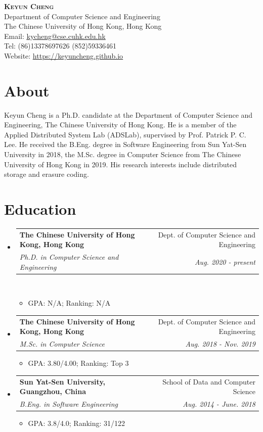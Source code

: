 \documentclass[letterpaper,11pt]{article}
\makeatletter
\newcommand{\resumeItem}[1]{
  \item\small{
    {#1 \vspace{-2pt}}
  }
}
\newcommand{\resumeSubheading}[4]{
  \vspace{-2pt}\item
    \begin{tabular*}{0.97\textwidth}[t]{l@{\extracolsep{\fill}}r}
      \textbf{#1} & #2 \\
      \textit{\small#3} & \textit{\small #4} \\
    \end{tabular*}\vspace{-4pt}
}
\newcommand{\resumeSubHeadingListStart}{\begin{itemize}[leftmargin=0.15in, label={}]}
\newcommand{\resumeSubHeadingListEnd}{\end{itemize}}
\newcommand{\resumeItemListStart}{\begin{itemize}}
\newcommand{\resumeItemListEnd}{\end{itemize}\vspace{-4pt}}
\makeatother
\begin{document}

\begin{center}
    \textbf{\huge \scshape Keyun Cheng} \\ \vspace{5pt}
    Department of Computer Science and Engineering \\
    The Chinese University of Hong Kong, Hong Kong \\
    Email: \href{mailto:kycheng@cse.cuhk.edu.hk}{\underline{kycheng@cse.cuhk.edu.hk}} \\
    Tel: (86)13378697626 (852)59336461 \\
    Website: \href{https://keyuncheng.github.io}{\underline{https://keyuncheng.github.io}}
\end{center}

\section{About}
Keyun Cheng is a Ph.D. candidate at the Department of Computer Science and
Engineering, The Chinese University of Hong Kong. He is a member of the
Applied Distributed System Lab (ADSLab), supervised by Prof. Patrick P. C.
Lee. He received the B.Eng. degree in Software Engineering from Sun Yat-Sen
University in 2018, the M.Sc. degree in Computer Science from The Chinese
University of Hong Kong in 2019. His research interests include distributed
storage and erasure coding.

\section{Education}
  \resumeSubHeadingListStart
    \resumeSubheading
      {The Chinese University of Hong Kong, Hong Kong}{Dept. of Computer Science and Engineering}
      {Ph.D. in Computer Science and Engineering}{Aug. 2020 - present} \\
      \resumeItemListStart
        \resumeItem{GPA: N/A; Ranking: N/A}
      \resumeItemListEnd
    \resumeSubheading
      {The Chinese University of Hong Kong, Hong Kong}{Dept. of Computer Science and Engineering}
      {M.Sc. in Computer Science}{Aug. 2018 - Nov. 2019}
      \resumeItemListStart
        \resumeItem{GPA: 3.80/4.00; Ranking: Top 3}
      \resumeItemListEnd
    \resumeSubheading
      {Sun Yat-Sen University, Guangzhou, China}{School of Data and Computer Science}
      {B.Eng. in Software Engineering}{Aug. 2014 - June. 2018}
      \resumeItemListStart
        \resumeItem{GPA: 3.8/4.0; Ranking: 31/122}
      \resumeItemListEnd
  \resumeSubHeadingListEnd
\end{document}
